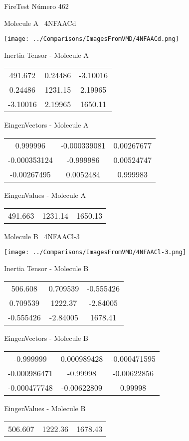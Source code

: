 \vtab[-3cm]
\begin{center}
{\large FireTest \tab Número 462}
\end{center}
\begin{multicols}{2}
\begin{center}

Molecule A \
4NFAACd

\texttt{[image: ../Comparisons/ImagesFromVMD/4NFAACd.png]}

Inertia Tensor - Molecule A \\
\begin{tabular}{|c c c|}
491.672	 & 	0.24486	 & 	-3.10016	 \\
0.24486	 & 	1231.15	 & 	2.19965	 \\
-3.10016	 & 	2.19965	 & 	1650.11
\end{tabular}

\vtab
 EingenVectors - Molecule A     \\
\begin{tabular}{|c c c|}
0.999996	 & 	-0.000339081	 & 	0.00267677	 \\
-0.000353124	 & 	-0.999986	 & 	0.00524747	 \\
-0.00267495	 & 	0.0052484	 & 	0.999983
\end{tabular}

\vtab
 EingenValues - Molecule A     \\
\begin{tabular}{|c c c|}
491.663	 & 	1231.14	 & 	1650.13	 \\
\end{tabular}
\columnbreak

Molecule B \
4NFAACl-3

\texttt{[image: ../Comparisons/ImagesFromVMD/4NFAACl-3.png]}

Inertia Tensor - Molecule B \\
\begin{tabular}{|c c c|}
506.608	 & 	0.709539	 & 	-0.555426	 \\
0.709539	 & 	1222.37	 & 	-2.84005	 \\
-0.555426	 & 	-2.84005	 & 	1678.41
\end{tabular}

\vtab
 EingenVectors - Molecule B     \\
\begin{tabular}{|c c c|}
-0.999999	 & 	0.000989428	 & 	-0.000471595	 \\
-0.000986471	 & 	-0.99998	 & 	-0.00622856	 \\
-0.000477748	 & 	-0.00622809	 & 	0.99998
\end{tabular}

\vtab
 EingenValues - Molecule B     \\
\begin{tabular}{|c c c|}
506.607	 & 	1222.36	 & 	1678.43	 \\
\end{tabular}

\end{center}
\end{multicols}

